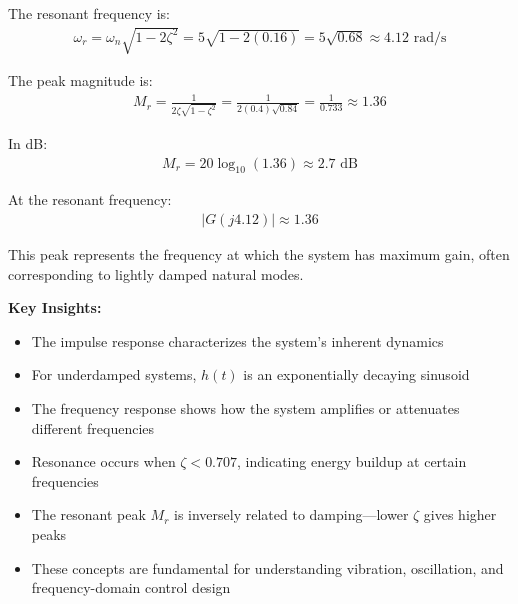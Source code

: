 \documentclass[11pt,a4paper]{article}
\begin{document}
The resonant frequency is:
\begin{align}
  \omega_r = \omega_n\sqrt{1 - 2\zeta^2} = 5\sqrt{1 - 2(0.16)} = 5\sqrt{0.68} \approx 4.12 \text{ rad/s}
\end{align}

The peak magnitude is:
\begin{align}
  M_r = \frac{1}{2\zeta\sqrt{1-\zeta^2}} = \frac{1}{2(0.4)\sqrt{0.84}} = \frac{1}{0.733} \approx 1.36
\end{align}

In dB:
\begin{align}
  M_r = 20\log_{10}(1.36) \approx 2.7 \text{ dB}
\end{align}

At the resonant frequency:
\begin{align}
  |G(j4.12)| \approx 1.36
\end{align}

This peak represents the frequency at which the system has maximum gain, often corresponding to lightly damped natural modes.

\textbf{Key Insights:}
\begin{itemize}
  \item The impulse response characterizes the system's inherent dynamics
  \item For underdamped systems, $h(t)$ is an exponentially decaying sinusoid
  \item The frequency response shows how the system amplifies or attenuates different frequencies
  \item Resonance occurs when $\zeta < 0.707$, indicating energy buildup at certain frequencies
  \item The resonant peak $M_r$ is inversely related to damping—lower $\zeta$ gives higher peaks
  \item These concepts are fundamental for understanding vibration, oscillation, and frequency-domain control design
\end{itemize}
\end{document}
